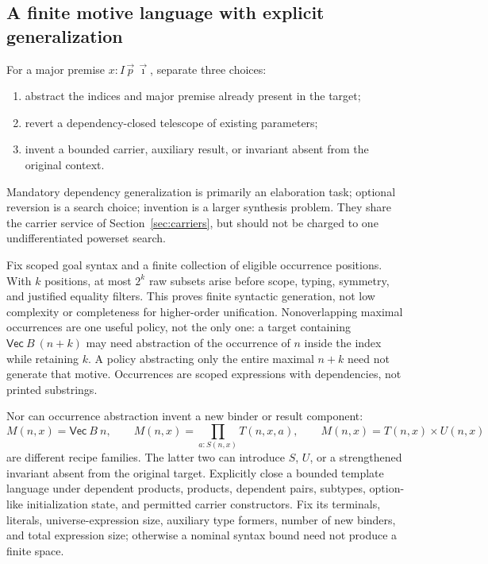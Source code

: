 \subsection{A finite motive language with explicit generalization}\label{sec:dependent-motives}

For a major premise $x:I\,\vec p\,\vec\imath$, separate three choices:
\begin{enumerate}
\item abstract the indices and major premise already present in the target;
\item revert a dependency-closed telescope of existing parameters;
\item invent a bounded carrier, auxiliary result, or invariant absent from the
original context.
\end{enumerate}
Mandatory dependency generalization is primarily an elaboration task;
optional reversion is a search choice; invention is a larger synthesis problem.
They share the carrier service of Section~\ref{sec:carriers}, but should not
be charged to one undifferentiated powerset search.

Fix scoped goal syntax and a finite collection of eligible occurrence positions.
With $k$ positions, at most $2^k$ raw subsets arise before scope, typing,
symmetry, and justified equality filters. This proves finite syntactic
generation, not low complexity or completeness for higher-order unification.
Nonoverlapping maximal occurrences are one useful policy, not the only one:
a target containing $\mathsf{Vec}\ B\ (n+k)$ may need abstraction of the
occurrence of $n$ inside the index while retaining $k$. A policy abstracting
only the entire maximal $n+k$ need not generate that motive. Occurrences are
scoped expressions with dependencies, not printed substrings.

Nor can occurrence abstraction invent a new binder or result component:
\[
 M(n,x)=\mathsf{Vec}\ B\ n,\qquad
 M(n,x)=\prod_{a:S(n,x)}T(n,x,a),\qquad
 M(n,x)=T(n,x)\times U(n,x)
\]
are different recipe families. The latter two can introduce $S$, $U$, or a
strengthened invariant absent from the original target. Explicitly close a
bounded template language under dependent products, products, dependent pairs,
subtypes, option-like initialization state, and permitted carrier constructors.
Fix its terminals, literals, universe-expression size, auxiliary type formers,
number of new binders, and total expression size; otherwise a nominal syntax
bound need not produce a finite space.

